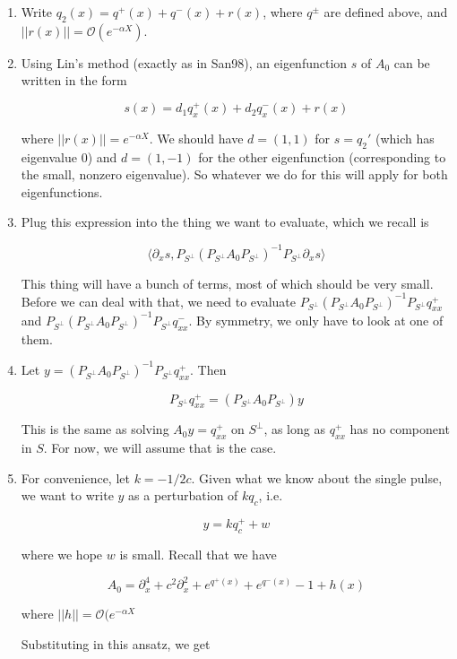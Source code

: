 \documentclass[12pt]{article}
\begin{document}
\begin{enumerate}

\item Write $q_2(x) = q^+(x) + q^-(x) + r(x)$, where $q^\pm$ are defined above, and $||r(x)|| = \mathcal{O}(e^{-\alpha X})$.

\item Using Lin's method (exactly as in San98), an eigenfunction $s$ of $A_0$ can be written in the form

\[
s(x) = d_1 q^+_x(x) + d_2 q^-_x(x) + r(x)
\]

where $||r(x)|| = e^{-\alpha X}$. We should have $d = (1, 1)$ for $s = q_2'$ (which has eigenvalue 0) and $d = (1, -1)$ for the other eigenfunction (corresponding to the small, nonzero eigenvalue). So whatever we do for this will apply for both eigenfunctions.

\item Plug this expression into the thing we want to evaluate, which we recall is

\[
\langle \partial_x s, P_{S^\perp} (P_{S^\perp} A_0 P_{S^\perp})^{-1} P_{S^\perp} \partial_x s \rangle
\]

This thing will have a bunch of terms, most of which should be very small. Before we can deal with that, we need to evaluate $P_{S^\perp} (P_{S^\perp} A_0 P_{S^\perp})^{-1} P_{S^\perp} q^+_{xx}$ and $P_{S^\perp} (P_{S^\perp} A_0 P_{S^\perp})^{-1} P_{S^\perp} q^-_{xx}$. By symmetry, we only have to look at one of them.

\item Let $y = (P_{S^\perp} A_0 P_{S^\perp})^{-1} P_{S^\perp} q^+_{xx}$. Then 

\[
P_{S^\perp} q^+_{xx} = (P_{S^\perp} A_0 P_{S^\perp}) y
\]

This is the same as solving $A_0 y = q^+_{xx}$ on $S^\perp$, as long as $q^+_{xx}$ has no component in $S$. For now, we will assume that is the case.

\item For convenience, let $k = -1/2c$. Given what we know about the single pulse, we want to write $y$ as a perturbation of $k q_c$, i.e.

\[
y = k q^+_c + w
\]

where we hope $w$ is small. Recall that we have

\[
A_0 = \partial_x^4 + c^2 \partial_x^2 + e^{q^+(x)} + e^{q^-(x)} - 1 + h(x)
\]

where $||h|| = \mathcal{O}(e^{-\alpha X}$

Substituting in this ansatz, we get


\end{enumerate}
\end{document}
